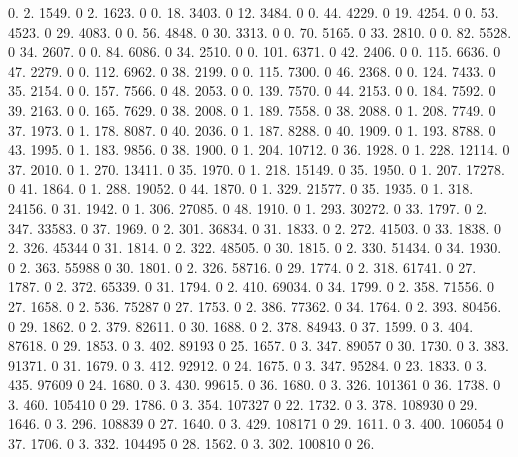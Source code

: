 0. 2. 1549. 0 2. 1623. 0 0. 18. 3403. 0 12. 3484. 0 0. 44. 4229. 0 19. 4254. 0 0. 53. 4523. 0 29. 4083. 0 0. 56. 4848. 0 30. 3313. 0 0. 70. 5165. 0 33. 2810. 0 0. 82. 5528. 0 34. 2607. 0 0. 84. 6086. 0 34. 2510. 0 0. 101. 6371. 0 42. 2406. 0 0. 115. 6636. 0 47. 2279. 0 0. 112. 6962. 0 38. 2199. 0 0. 115. 7300. 0 46. 2368. 0 0. 124. 7433. 0 35. 2154. 0 0. 157. 7566. 0 48. 2053. 0 0. 139. 7570. 0 44. 2153. 0 0. 184. 7592. 0 39. 2163. 0 0. 165. 7629. 0 38. 2008. 0 1. 189. 7558. 0 38. 2088. 0 1. 208. 7749. 0 37. 1973. 0 1. 178. 8087. 0 40. 2036. 0 1. 187. 8288. 0 40. 1909. 0 1. 193. 8788. 0 43. 1995. 0 1. 183. 9856. 0 38. 1900. 0 1. 204. 10712. 0 36. 1928. 0 1. 228. 12114. 0 37. 2010. 0 1. 270. 13411. 0 35. 1970. 0 1. 218. 15149. 0 35. 1950. 0 1. 207. 17278. 0 41. 1864. 0 1. 288. 19052. 0 44. 1870. 0 1. 329. 21577. 0 35. 1935. 0 1. 318. 24156. 0 31. 1942. 0 1. 306. 27085. 0 48. 1910. 0 1. 293. 30272. 0 33. 1797. 0 2. 347. 33583. 0 37. 1969. 0 2. 301. 36834. 0 31. 1833. 0 2. 272. 41503. 0 33. 1838. 0 2. 326. 45344 0 31. 1814. 0 2. 322. 48505. 0 30. 1815. 0 2. 330. 51434. 0 34. 1930. 0 2. 363. 55988 0 30. 1801. 0 2. 326. 58716. 0 29. 1774. 0 2. 318. 61741. 0 27. 1787. 0 2. 372. 65339. 0 31. 1794. 0 2. 410. 69034. 0 34. 1799. 0 2. 358. 71556. 0 27. 1658. 0 2. 536. 75287 0 27. 1753. 0 2. 386. 77362. 0 34. 1764. 0 2. 393. 80456. 0 29. 1862. 0 2. 379. 82611. 0 30. 1688. 0 2. 378. 84943. 0 37. 1599. 0 3. 404. 87618. 0 29. 1853. 0 3. 402. 89193 0 25. 1657. 0 3. 347. 89057 0 30. 1730. 0 3. 383. 91371. 0 31. 1679. 0 3. 412. 92912. 0 24. 1675. 0 3. 347. 95284. 0 23. 1833. 0 3. 435. 97609 0 24. 1680. 0 3. 430. 99615. 0 36. 1680. 0 3. 326. 101361 0 36. 1738. 0 3. 460. 105410 0 29. 1786. 0 3. 354. 107327 0 22. 1732. 0 3. 378. 108930 0 29. 1646. 0 3. 296. 108839 0 27. 1640. 0 3. 429. 108171 0 29. 1611. 0 3. 400. 106054 0 37. 1706. 0 3. 332. 104495 0 28. 1562. 0 3. 302. 100810 0 26. 